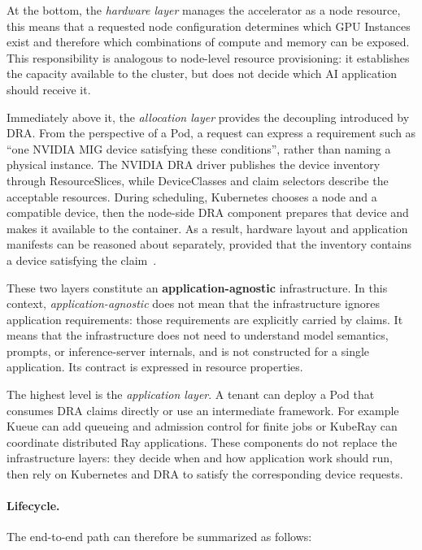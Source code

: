At the bottom, the \emph{hardware layer} manages the accelerator as a node resource, this means that a requested node configuration determines which GPU Instances exist and therefore which combinations of compute and memory can be exposed. This responsibility is analogous to node-level resource provisioning: it establishes the capacity available to the cluster, but does not decide which AI application should receive it.

Immediately above it, the \emph{allocation layer} provides the decoupling introduced by DRA. From the perspective of a Pod, a request can express a requirement such as ``one NVIDIA MIG device satisfying these conditions'', rather than naming a physical instance. The NVIDIA DRA driver publishes the device inventory through ResourceSlices, while DeviceClasses and claim selectors describe the acceptable resources. During scheduling, Kubernetes chooses a node and a compatible device, then the node-side DRA component prepares that device and makes it available to the container. As a result, hardware layout and application manifests can be reasoned about separately, provided that the inventory contains a device satisfying the claim~\cite{kubernetes135dra,nvidia2026dradriverarchitecture}.

These two layers constitute an \textbf{application-agnostic} infrastructure. In this context, \emph{application-agnostic} does not mean that the infrastructure ignores application requirements: those requirements are explicitly carried by claims. It means that the infrastructure does not need to understand model semantics, prompts, or inference-server internals, and is not constructed for a single application. Its contract is expressed in resource properties.

The highest level is the \emph{application layer}. A tenant can deploy a Pod that consumes DRA claims directly or use an intermediate framework. For example Kueue can add queueing and admission control for finite jobs or KubeRay can coordinate distributed Ray applications. These components do not replace the infrastructure layers: they decide when and how application work should run, then rely on Kubernetes and DRA to satisfy the corresponding device requests.

\paragraph{Lifecycle.} The end-to-end path can therefore be summarized as follows:


